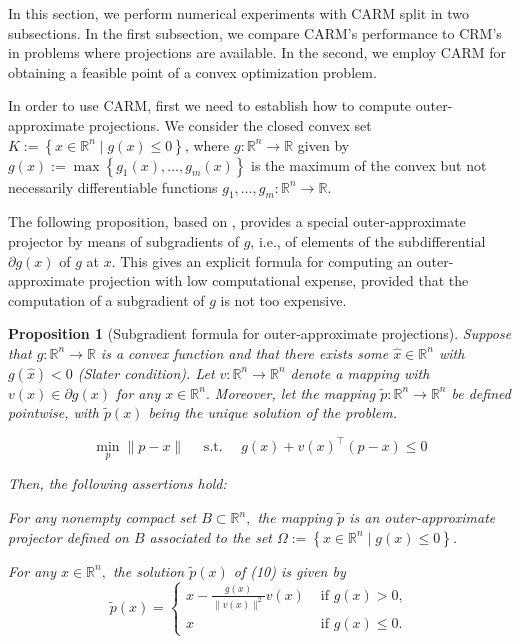 \documentclass[smallextended,numbook,nospthms]{svjour3}
\theoremstyle{plain}
\newtheorem{proposition}[theorem]{Proposition}
\theoremstyle{definition}
\def\RR{\mathds R}
\begin{document}
In this section, we perform numerical experiments with CARM split in two subsections. In the first subsection, we compare CARM's performance to CRM's in problems where projections are available. In the second, we employ CARM for obtaining a feasible point of a convex optimization problem. 

In order to use CARM, first we need to establish how to compute outer-approximate projections. We consider the closed convex set $K:=\left\{x \in \RR^{n} \mid g(x) \leq 0\right\}$, where $g: \RR^{n} \rightarrow \RR$ given by $g(x):=\max \left\{g_{1}(x), \ldots, g_{m}(x)\right\}$ is the maximum of the convex but not necessarily differentiable functions $g_{1}, \ldots, g_{m}: \RR^{n} \rightarrow \RR$.

The following proposition, based on \cite{Fukushima:1983},  provides a special outer-approximate projector by means of subgradients of $g$, i.e., of elements of the subdifferential $\partial g(x)$ of $g$ at $x$. This gives an explicit formula for computing an outer-approximate projection with low computational expense, provided that the computation of a subgradient of $g$ is not too expensive.

\begin{proposition}[Subgradient formula for outer-approximate projections]\label{prop:approx proj formula}
	Suppose that $g: \RR^{n} \rightarrow \RR$ is a convex function and that there exists some $\hat{x} \in \RR^{n}$ with $g(\hat{x})<0$ (Slater condition). Let $v: \RR^{n} \rightarrow \RR^{n}$ denote a mapping with $v(x) \in \partial g(x)$ for any $x \in \RR^{n} .$ Moreover, let the mapping $\tilde{p}: \RR^{n} \rightarrow \RR^{n}$ be defined
	pointwise, with $\tilde{p}(x)$ being the unique solution of the problem.
	
	\begin{equation}
		\min _{p}\|p-x\| \quad \text { s.t. } \quad g(x)+v(x)^{\top}(p-x) \leq 0
	\end{equation}
	
	Then, the following assertions hold:
	\begin{listi}
		\item  For any nonempty compact set $B \subset \RR^{n},$ the mapping $\tilde{p}$ is an outer-approximate projector defined on $B$ associated to the set $\Omega:=\left\{x \in \RR^{n} \mid g(x) \leq 0\right\}$.
		
		\item  For any $x \in \RR^{n},$ the solution $\tilde{p}(x)$ of (10) is given by
		\[
		\tilde{p}(x)=\left\{\begin{array}{ll}
			x-\frac{g(x)}{\|v(x)\|^{2}} v(x) & \text { if } g(x)>0, \\
			x & \text { if } g(x) \leq 0.
		\end{array}\right.
		\]
	\end{listi}
\end{proposition}
\end{document}
